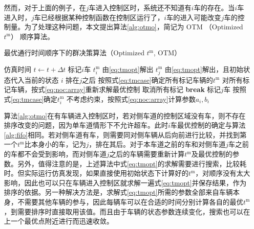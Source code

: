 然而，对于上面的例子，在$j$车进入控制区时，系统还不知道有$i$车的存在。当$i$车进入时，$j$车已经根据某种控制函数在控制区运行了，$i$车的进入可能改变$j$车的控制量。为了处理这种问题，本文提出算法\eqref{alg:otmo}，简记为 OTM （Optimized $t^\mathrm{m}$） 顺序算法。
\begin{algorithm}[htbp]
\caption{最优通行时间顺序下的群决策算法（Optimized $t^\mathrm{m}$, OTM）}
\label{alg:otmo}
\begin{algorithmic}
  \Statex
    \State 仿真时间 $t\gets t+\Delta t$
          \State 标记$i$车
            \State $t_i^\mathrm{m}$ 由\eqref{eq:tmopt}解出
            \State $t_j^\mathrm{m}$ 由\eqref{eq:tmopt}解出，且初始状态代入当前的状态
              \State $i$ 排在$j$之后
              \State 按照式\eqref{eq:tmcase}确定所有标记车辆的$t^\mathrm{m}$
              \State 对所有标记车辆，按式\eqref{eq:noc:array}重新求解最优控制
              \State 取消所有标记
              \State \textbf{break}
            \EndIf
            \State 标记$j$车
          \EndFor
        \Else
          \State 按照式\eqref{eq:tmcase}确定$t_i^\mathrm{m}$
          \State 不考虑约束，按照式\eqref{eq:noc:array}计算参数$a_i, b_i$
        \EndIf
      \EndFor
    \EndIf
  \EndWhile
\end{algorithmic}
\end{algorithm}

\begin{remark}
算法\eqref{alg:otmo}在有车辆进入控制区时，若对侧车道的控制区域没有车，则不存在排序改变的问题，因为单车道情形下不允许超车。此时$i$车最优控制的确定与算法\eqref{alg:fifo}相同。若对侧车道有车，则需要同对侧车辆从后向前进行比较，并找到第一个$t^\mathrm{m}$比本身小的车，记为$j$，排在其后。对于本车道之前的车和对侧车道$j$车之前的车都不会受到影响，而对侧车道$j$之后的车辆需要重新计算$t^\mathrm{m}$及最优控制的参数。另外，值得注意的是，上述算法中式\eqref{eq:tmopt}的求解需要进行搜索，比较耗时。但实际运行仿真发现，如果直接使用初始状态下计算好的$t^\mathrm{m}$，对顺序没有太大影响，因此也可以只在车辆进入控制区就求解一遍式\eqref{eq:tmopt}并保存结果，作为排序的依据。另一种解决方法是，求解式\eqref{eq:tmopt}所需的参数全部来自车辆本身，不需要其他车辆的参与，因此每辆车可以在合适的时间分别计算各自的最优$t^\mathrm{m}$，到需要排序时直接取用该值。而且由于车辆的状态参数连续变化，搜索也可以在上一个最优点附近进行而迅速收敛。
\end{remark}
